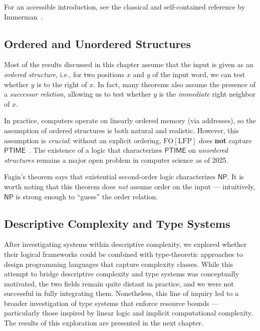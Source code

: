 For an accessible introduction, see the classical and self-contained reference
by Immerman~\cite{Immerman1999-IMMDC}.

\subsection{Ordered and Unordered Structures}

Most of the results discussed in this chapter assume that the input is
given as an \emph{ordered structure}, i.e., for two positions \(x\) and \(y\)
of the input word, we can test whether \(y\) is to the right of \(x\).
In fact, many theorems also assume the presence of a \emph{successor relation},
allowing us to test whether \(y\) is the \emph{immediate} right neighbor of \(x\).

In practice, computers operate on linearly ordered memory
(via addresses), so the assumption of ordered structures is both natural
and realistic.
However, this assumption is \emph{crucial}:
without an explicit ordering, \(\mathrm{FO[LFP]}\) does \textbf{not} capture
\(\mathsf{PTIME}\)~\cite{Cai1992}.
The existence of a logic that characterizes \(\mathsf{PTIME}\) on
\emph{unordered structures} remains a major open problem in computer science as of 2025.

Fagin's theorem says that existential second-order logic characterizes
\(\mathsf{NP}\).
It is worth noting that this theorem does \emph{not} assume order on the input ---
intuitively, \(\mathsf{NP}\) is strong enough to ``guess'' the order relation.

\subsection{Descriptive Complexity and Type Systems}

After investigating systems within descriptive complexity, we explored
whether their logical frameworks could be combined with type-theoretic
approaches to design programming languages that capture complexity classes.
While this attempt to bridge descriptive complexity and type systems
was conceptually motivated, the two fields remain quite distant in practice,
and we were not successful in fully integrating them.
Nonetheless, this line of inquiry led to a broader investigation of
type systems that enforce resource bounds --- particularly those inspired
by linear logic and implicit computational complexity.
The results of this exploration are presented in the next chapter.

